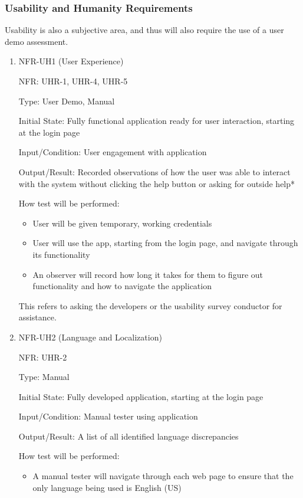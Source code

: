\documentclass[12pt, titlepage]{article}
\begin{document}
\subsubsection{Usability and Humanity Requirements}
Usability is also a subjective area, and thus will also require the use of a
user demo assessment.
\begin{enumerate}

  \item{NFR-UH1 (User Experience)\\}
  
  NFR: UHR-1, UHR-4, UHR-5

  Type: User Demo, Manual

  Initial State: Fully functional application ready for user interaction,
  starting at the login page
  
  Input/Condition: User engagement with application
  
  Output/Result: Recorded observations of how the user was able to interact with
  the system without clicking the help button or asking for outside help*
  
  How test will be performed:
  \begin{itemize}
    \item User will be given temporary, working credentials 
    \item User will use the app, starting from the login page, and navigate
    through its functionality
    \item An observer will record how long it takes for them to figure out
    functionality and how to navigate the application
  \end{itemize}
  {\footnotesize *This refers to asking the developers or the usability survey conductor
  for assistance.}
            
  \item{NFR-UH2 (Language and Localization)\\}
  
  NFR: UHR-2
  
  Type: Manual
  
  Initial State: Fully developed application, starting at the login page
  
  Input/Condition: Manual tester using application
  
  Output/Result: A list of all identified language discrepancies
  
  How test will be performed:
  \begin{itemize}
    \item A manual tester will navigate through each web page to ensure that the
    only language being used is English (US)  
  \end{itemize}


\end{enumerate}
\end{document}
